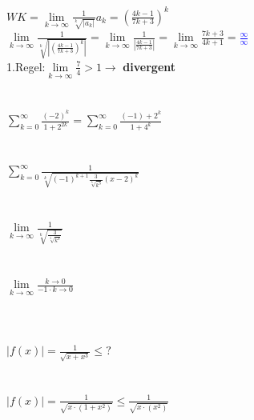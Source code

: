 \documentclass[12pt,a4paper]{article}
\begin{document}
\newpage
$WK=\lim\limits_{k\rightarrow\infty}\frac{1}{\sqrt[k]{|a_k|}} a_k=(\frac{4k-1}{7k+3})^k$\\
$\lim\limits_{k\rightarrow\infty}\frac{1}{\sqrt[k]{|(\frac{4k-1}{7k+3})^k|}} = \lim\limits_{k\rightarrow\infty}\frac{1}{|\frac{4k-1}{7k+3}|} = \lim\limits_{k\rightarrow\infty}\frac{7k+3}{4k+1}=$\textcolor{blue}{$\frac{\infty}{\infty}$}\\
1.Regel:$\lim\limits_{k\rightarrow\infty}\frac{7}{4} > 1 \rightarrow$ \textbf{divergent}\\
\\
\\
$\sum\limits_{k=0}^{\infty}\frac{(-2)^k}{1+2^{2k}}=\sum\limits_{k=0}^{\infty}\frac{(-1)+2^k}{1+4^k}$\\
\\
\\
$\sum\limits_{k=0}^{\infty}\frac{1}{\sqrt[k]{(-1)^{k+1}\frac{3}{\sqrt[5]{k^3}}(x-2)^k}}$\\
\\
\\
$\lim\limits_{k\rightarrow\infty}\frac{1}{\sqrt[k]{\frac{3}{\sqrt[5]{k^3}}}}$\\
\\
\\
$\lim\limits_{k\rightarrow\infty}\frac{k\rightarrow 0}{-1 \cdot k\rightarrow 0}$\\
\\
\\
\\
$|f(x)|=\frac{1}{\sqrt{x+x^3}}\leq ?$
\\
\\
\\
$|f(x)|=\frac{1}{\sqrt{x\cdot(1+x^2)}}\leq \frac{1}{\sqrt{x\cdot(x^2)}}$
\end{document}
